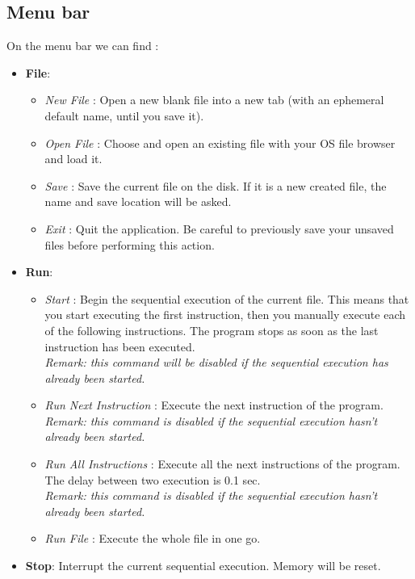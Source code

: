 \subsection{Menu bar}
On the menu bar we can find :
\begin{itemize}
    \item \textbf{File}:
    \begin{itemize}
        \item \textit{New File} : Open a new blank file into a new tab (with an ephemeral default name, until you save it).
        \item \textit{Open File} : Choose and open an existing file with your OS file browser and load it.
        \item \textit{Save} : Save the current file on the disk. If it is a new created file, the name and save location will be asked.
        \item \textit{Exit} : Quit the application. Be careful to previously save
        your unsaved files before performing this action.
    \end{itemize}
    \item \textbf{Run}:
    \begin{itemize}
        \item \textit{Start} : Begin the sequential execution of the current file. This means that you start executing the first instruction, then you manually execute each of the following instructions. The program stops as soon as the last instruction has been executed.\\
        \textit{Remark: this command will be disabled if the sequential execution has already been started.}
        \item \textit{Run Next Instruction} : Execute the next instruction of the program.\\
        \textit{Remark: this command is disabled if the sequential execution hasn't already been started.}
        \item \textit{Run All Instructions} : Execute all the next instructions of the program. The delay between two execution is 0.1 sec.\\
        \textit{Remark: this command is disabled if the sequential execution hasn't already been started.}
        \item \textit{Run File} : Execute the whole file in one go.
    \end{itemize}
    \item \textbf{Stop}: Interrupt the current sequential execution. Memory will be reset.\\

\end{itemize}
